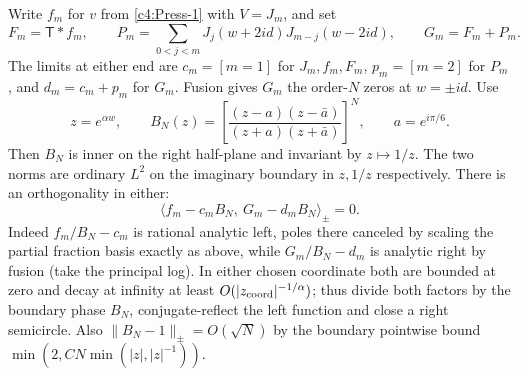 Write \(f_m\) for \(v\) from \eqref{c4:Press-1} with \(V=J_m\), and set
\[
 F_m=\mathsf T*f_m,\qquad
 P_m=\sum_{0<j<m}J_j(w+2id)J_{m-j}(w-2id),\qquad G_m=F_m+P_m.
\]
The limits at either end are \(c_m=[m=1]\) for \(J_m,f_m,F_m\),
\(p_m=[m=2]\) for \(P_m\), and \(d_m=c_m+p_m\) for \(G_m\).
Fusion gives \(G_m\) the order-\(N\) zeros at \(w=\pm id\).
Use
\[
          z=e^{\alpha w},\qquad
          B_N(z)=\left[\frac{(z-a)(z-\bar a)}{(z+a)(z+\bar a)}\right]^N,\qquad a=e^{i\pi/6}.
\]
Then \(B_N\) is inner on the right half-plane and invariant by \(z\mapsto1/z\). The two norms are ordinary \(L^2\) on the imaginary boundary in \(z,1/z\) respectively. There is an orthogonality in either:
\[
                 \langle f_m-c_m B_N,\ G_m-d_m B_N\rangle_\pm=0 .
\]
Indeed \(f_m/B_N-c_m\) is rational analytic left, poles there canceled by scaling the partial fraction basis exactly as above, while \(G_m/B_N-d_m\) is analytic right by fusion (take the principal log). In either chosen coordinate both are bounded at zero and decay at infinity at least \(O(|z_{\rm coord}|^{-1/\alpha})\); thus divide both factors by the boundary phase \(B_N\), conjugate-reflect the left function and close a right semicircle. Also \(\|B_N-1\|_\pm=O(\sqrt N)\) by the boundary pointwise bound \(\min(2,CN\min(|z|,|z|^{-1}))\).


